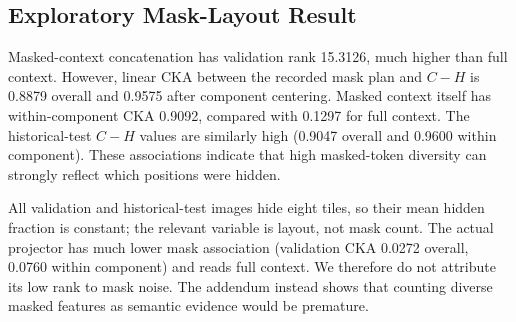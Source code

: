 \subsection{Exploratory Mask-Layout Result}
Masked-context concatenation has validation rank 15.3126, much higher than full context. However, linear CKA between the recorded mask plan and $C-H$ is 0.8879 overall and 0.9575 after component centering. Masked context itself has within-component CKA 0.9092, compared with 0.1297 for full context. The historical-test $C-H$ values are similarly high (0.9047 overall and 0.9600 within component). These associations indicate that high masked-token diversity can strongly reflect which positions were hidden.

All validation and historical-test images hide eight tiles, so their mean hidden fraction is constant; the relevant variable is layout, not mask count. The actual projector has much lower mask association (validation CKA 0.0272 overall, 0.0760 within component) and reads full context. We therefore do not attribute its low rank to mask noise. The addendum instead shows that counting diverse masked features as semantic evidence would be premature.
